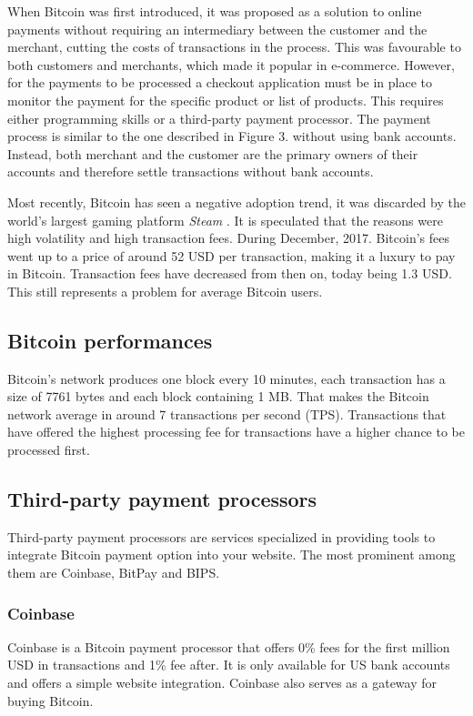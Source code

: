 \documentclass{ferseminar}
\begin{document}
When Bitcoin was first introduced, it was proposed as a solution to online payments without requiring an intermediary between the customer and the merchant, cutting the costs of transactions in the process. This was favourable to both customers and merchants, which made it popular in e-commerce. However, for the payments to be processed a checkout application must be in place to monitor the payment for the specific product or list of products. This requires either programming skills or a third-party payment processor. The payment process is similar to the one described in Figure 3. without using bank accounts. Instead, both merchant and the customer are the primary owners of their accounts and therefore settle transactions without bank accounts.

Most recently, Bitcoin has seen a negative adoption trend, it was discarded by the world's largest gaming platform \textit{Steam} \cite{Steam}. It is speculated that the reasons were high volatility and high transaction fees. During December, 2017. Bitcoin's fees went up to a price of around 52 USD per transaction, making it a luxury to pay in Bitcoin. Transaction fees have decreased from then on, today being 1.3 USD. This still represents a problem for average Bitcoin users.


\subsection{Bitcoin performances}
Bitcoin's network produces one block every 10 minutes, each transaction has a size of 7761 bytes and each block containing 1 MB. That makes the Bitcoin network average in around 7 transactions per second (TPS). Transactions that have offered the highest processing fee for transactions have a higher chance to be processed first.


\subsection{Third-party payment processors}
Third-party payment processors are services specialized in providing tools to integrate Bitcoin payment option into your website. The most prominent among them are Coinbase, BitPay and BIPS. 

\subsubsection{Coinbase}
Coinbase is a Bitcoin payment processor that offers 0\% fees for the first million USD in transactions and 1\% fee after. It is only available for US bank accounts and offers a simple website integration. Coinbase also serves as a gateway for buying Bitcoin.
\end{document}
